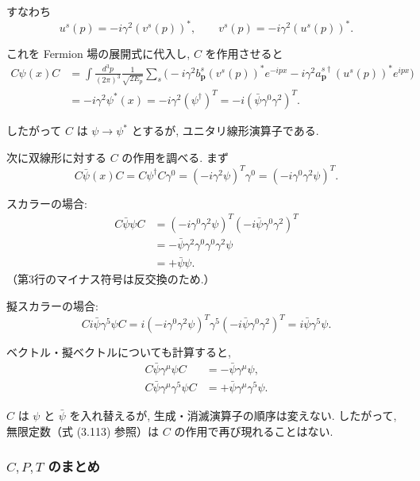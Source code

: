 \documentclass[a4paper,12pt]{article}
\begin{document}
すなわち
\begin{equation}
u^s(p) = -i\gamma^2 (v^s(p))^*, 
\qquad 
v^s(p) = -i\gamma^2 (u^s(p))^* .
\tag{3.144}
\end{equation}

これを Fermion 場の展開式に代入し, $C$ を作用させると
\begin{align*}
C\psi(x)C &= \int \frac{d^3p}{(2\pi)^3}\frac{1}{\sqrt{2E_p}}
\sum_s \Big( -i\gamma^2 b_{\mathbf{p}}^s (v^s(p))^* e^{-ipx}
- i\gamma^2 a_{\mathbf{p}}^{s\dagger}(u^s(p))^* e^{ipx} \Big) \\
&= -i\gamma^2 \psi^*(x) 
= -i\gamma^2 (\psi^\dagger)^T 
= -i (\bar{\psi}\gamma^0\gamma^2)^T.
\tag{3.145}
\end{align*}

したがって $C$ は $\psi\to\psi^*$ とするが, ユニタリ線形演算子である.

次に双線形に対する $C$ の作用を調べる. まず
\begin{equation*}
C\bar{\psi}(x)C = C\psi^\dagger C \gamma^0 = (-i\gamma^2\psi)^T\gamma^0 
= (-i\gamma^0\gamma^2\psi)^T.
\tag{3.146}
\end{equation*}

スカラーの場合:
\begin{align*}
C\bar{\psi}\psi C &= (-i\gamma^0\gamma^2\psi)^T(-i\bar{\psi}\gamma^0\gamma^2)^T \\
&= -\bar{\psi}\gamma^2\gamma^0\gamma^0\gamma^2\psi \\
&= +\bar{\psi}\psi.
\tag{3.147}
\end{align*}
（第3行のマイナス符号は反交換のため.）

擬スカラーの場合:
\begin{equation*}
C i\bar{\psi}\gamma^5\psi C 
= i(-i\gamma^0\gamma^2\psi)^T \gamma^5 (-i\bar{\psi}\gamma^0\gamma^2)^T
= i\bar{\psi}\gamma^5\psi.
\tag{3.148}
\end{equation*}

ベクトル・擬ベクトルについても計算すると,
\begin{align*}
C\bar{\psi}\gamma^\mu\psi C &= -\bar{\psi}\gamma^\mu\psi, 
\tag{3.149}\\
C\bar{\psi}\gamma^\mu\gamma^5\psi C &= +\bar{\psi}\gamma^\mu\gamma^5\psi .
\tag{3.150}
\end{align*}

$C$ は $\psi$ と $\bar{\psi}$ を入れ替えるが, 生成・消滅演算子の順序は変えない.  
したがって, 無限定数（式 (3.113) 参照）は $C$ の作用で再び現れることはない.

\subsubsection*{$C,P,T$ のまとめ}
\end{document}
